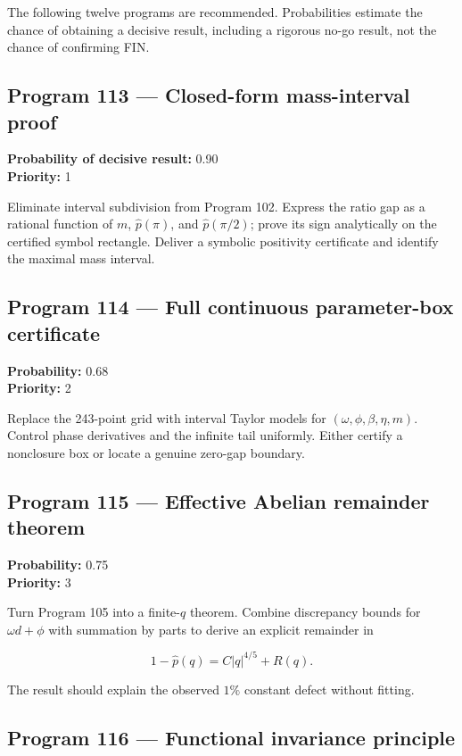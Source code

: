 \documentclass[11pt,a4paper,openany]{report}
\begin{document}
The following twelve programs are recommended. Probabilities estimate the chance of obtaining a decisive result, including a rigorous no-go result, not the chance of confirming FIN.

\subsection{Program 113 --- Closed-form mass-interval proof}

\textbf{Probability of decisive result:} 0.90\\
\textbf{Priority:} 1

Eliminate interval subdivision from Program 102. Express the ratio gap as a rational function of \(m\), \(\widehat p(\pi)\), and \(\widehat p(\pi/2)\); prove its sign analytically on the certified symbol rectangle. Deliver a symbolic positivity certificate and identify the maximal mass interval.

\subsection{Program 114 --- Full continuous parameter-box certificate}

\textbf{Probability:} 0.68\\
\textbf{Priority:} 2

Replace the 243-point grid with interval Taylor models for \((\omega,\phi,\beta,\eta,m)\). Control phase derivatives and the infinite tail uniformly. Either certify a nonclosure box or locate a genuine zero-gap boundary.

\subsection{Program 115 --- Effective Abelian remainder theorem}

\textbf{Probability:} 0.75\\
\textbf{Priority:} 3

Turn Program 105 into a finite-\(q\) theorem. Combine discrepancy bounds for \(\omega d+\phi\) with summation by parts to derive an explicit remainder in

\[
1-\widehat p(q)=C|q|^{4/5}+R(q).
\]

The result should explain the observed \(1\%\) constant defect without fitting.

\subsection{Program 116 --- Functional invariance principle}
\end{document}
